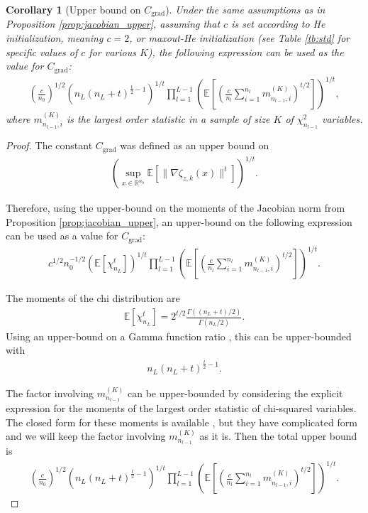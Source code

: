 \documentclass{article}
\newtheorem{corollary}[theorem]{Corollary}
\theoremstyle{definition}
\newcommand{\nin}{n_0}
\begin{document}
\begin{corollary}[Upper bound on $C_{\text{grad}}$]
    Under the same assumptions as in Proposition \ref{prop:jacobian_upper}, assuming that $c$ is set according to He initialization, meaning $c = 2$, or maxout-He initialization (see Table \ref{tb:std} for specific values of $c$ for various $K$), the following expression can be used as the value for $C_{\text{grad}}$: 
    \begin{align*}
        \left(\frac{c}{\nin}\right)^{1/2} \left(n_L (n_L + t)^{\frac{t}{2} - 1}\right)^{1/t} \prod_{l = 1}^{L-1} \left( \mathbb{E} \left[ \left( \frac{c}{n_l} \sum_{i=1}^{n_l}  m^{(K)}_{n_{l-1}, i} \right)^{t/2} \right]\right)^{1/t}, 
    \end{align*}
    where $m^{(K)}_{n_{l-1}, i}$ is the largest order statistic in a sample of size $K$ of $\chi_{n_{l-1}}^2$ variables. 
\end{corollary}
\begin{proof}
    The constant $C_{\text{grad}}$ was defined as an upper bound on 
    \begin{align*}
        \left(\sup\limits_{x \in \mathbb{R}^{\nin}} \mathbb{E}[\| \nabla \zeta_{z, k}(x) \|^t]\right)^{1/t}.
    \end{align*}

    Therefore, using the upper-bound on the moments of the Jacobian norm from Proposition \ref{prop:jacobian_upper}, an upper-bound on the following expression can be used as a value for $C_{\text{grad}}$: 
    \begin{align*}
        c^{1/2} n_0^{-1/2} \left(\mathbb{E}[\chi_{n_{L}}^t] \right)^{1/t} \prod_{l = 1}^{L-1} \left( \mathbb{E} \left[ \left( \frac{c}{n_l} \sum_{i=1}^{n_l}  m^{(K)}_{n_{l-1}, i} \right)^{t/2} \right]\right)^{1/t}.
    \end{align*}
    
    The moments of the chi distribution are 
    \begin{align*}
        \mathbb{E}\left[\chi_{n_{L}}^t\right] = 2^{t/2} \frac{\Gamma((n_L + t) / 2)}{\Gamma(n_L / 2)}.
    \end{align*}
    Using an upper-bound on a Gamma function ratio \citep[see][Equation 12]{jameson2013inequalities}, this can be upper-bounded with 
    \begin{align*}
        n_L (n_L + t)^{\frac{t}{2} - 1}. 
    \end{align*}
    
    The factor involving $m^{(K)}_{n_{l-1}}$ can be upper-bounded by considering the explicit expression for the moments of the largest order statistic of chi-squared variables.
    The closed form for these moments is available \citep[see][]{nadarajah2008explicit}, but they have complicated form and we will keep the factor involving $m^{(K)}_{n_{l-1}}$ as it is. 
%
    Then the total upper bound is
    \begin{align*}
        \left(\frac{c}{\nin}\right)^{1/2} \left(n_L (n_L + t)^{\frac{t}{2} - 1}\right)^{1/t} \prod_{l = 1}^{L-1} \left( \mathbb{E} \left[ \left( \frac{c}{n_l} \sum_{i=1}^{n_l}  m^{(K)}_{n_{l-1}, i} \right)^{t/2} \right]\right)^{1/t}.
    \end{align*}
\end{proof}
\end{document}
